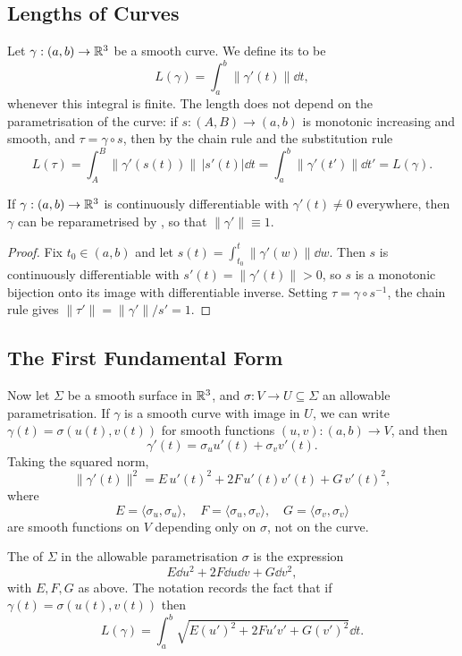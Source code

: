 \documentclass[a4paper]{scrartcl}
\begin{document}
\subsection{Lengths of Curves}

Let $\gamma: (a, b) \rightarrow \mathbb{R}^3$ be a smooth curve. We define its  to be
$$
L(\gamma) = \int_a^b \|\gamma'(t)\| \dd t,
$$
whenever this integral is finite. The length does not depend on the parametrisation of the curve: if $s: (A, B) \rightarrow (a, b)$ is monotonic increasing and smooth, and $\tau = \gamma \circ s$, then by the chain rule and the substitution rule
$$
L(\tau) = \int_A^B \|\gamma'(s(t))\| \, |s'(t)| \dd t = \int_a^b \|\gamma'(t')\| \dd t' = L(\gamma).
$$

\begin{lemma}
    If $\gamma: (a, b) \rightarrow \mathbb{R}^3$ is continuously differentiable with $\gamma'(t) \neq 0$ everywhere, then $\gamma$ can be reparametrised by , so that $\|\gamma'\| \equiv 1$.
\end{lemma}
\begin{proof}
    Fix $t_0 \in (a,b)$ and let $s(t) = \int_{t_0}^t \|\gamma'(w)\|\dd w$. Then $s$ is continuously differentiable with $s'(t) = \|\gamma'(t)\| > 0$, so $s$ is a monotonic bijection onto its image with differentiable inverse. Setting $\tau = \gamma \circ s^{-1}$, the chain rule gives $\|\tau'\| = \|\gamma'\| / s' = 1$.
\end{proof}

\subsection{The First Fundamental Form}

Now let $\Sigma$ be a smooth surface in $\mathbb{R}^3$, and $\sigma: V \rightarrow U \subseteq \Sigma$ an allowable parametrisation. If $\gamma$ is a smooth curve with image in $U$, we can write $\gamma(t) = \sigma(u(t), v(t))$ for smooth functions $(u, v): (a,b) \rightarrow V$, and then
$$
\gamma'(t) = \sigma_u u'(t) + \sigma_v v'(t).
$$
Taking the squared norm,
$$
\|\gamma'(t)\|^2 = E \, u'(t)^2 + 2F\, u'(t) v'(t) + G \, v'(t)^2,
$$
where
$$
E = \langle \sigma_u, \sigma_u \rangle, \quad F = \langle \sigma_u, \sigma_v \rangle, \quad G = \langle \sigma_v, \sigma_v \rangle
$$
are smooth functions on $V$ depending only on $\sigma$, not on the curve.

\begin{definition}
    The  of $\Sigma$ in the allowable parametrisation $\sigma$ is the expression
    $$
    E \dd u^2 + 2F \dd u \dd v + G \dd v^2,
    $$
    with $E, F, G$ as above. The notation records the fact that if $\gamma(t) = \sigma(u(t), v(t))$ then
    $$
    L(\gamma) = \int_a^b \sqrt{E (u')^2 + 2 F u' v' + G (v')^2} \dd t.
    $$
\end{definition}
\end{document}

